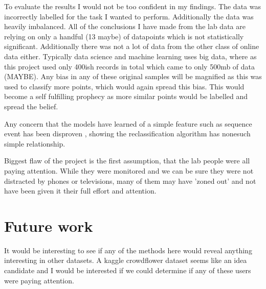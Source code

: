 \documentclass{article}
\begin{document}
To evaluate the results I would not be too confident in my findings.
The data was incorrectly labelled for the task I wanted to perform.
Additionally the data was heavily imbalanced.
All of the conclusions I have made from the lab data are relying on only a handful (13 maybe) of datapoints which is not statistically significant.
Additionally there was not a lot of data from the other class of online data either.
Typically data science and machine learning uses big data, where as this project used only 400ish records in total which came to only 500mb of data (MAYBE).
Any bias in any of these original samples will be magnified as this was used to classify more points, which would again spread this bias.
This would become a self fulfilling prophecy as more similar points would be labelled and spread the belief.

Any concern that the models have learned of a simple feature such as sequence event has been disproven
, showing the reclassification algorithm has nonesuch simple relationship.

Biggest flaw of the project is the first assumption, that the lab people were all paying attention.
While they were monitored and we can be sure they were not distracted by phones or televisions, many of them may have 'zoned out' and not have been given it their full effort and attention.

\section{Future work}
It would be interesting to see if any of the methods here would reveal anything interesting in other datasets.
A kaggle crowdflower dataset seems like an idea candidate and I would be interested if we could determine if any of these users were paying attention. 

\printbibliography
\end{document}
